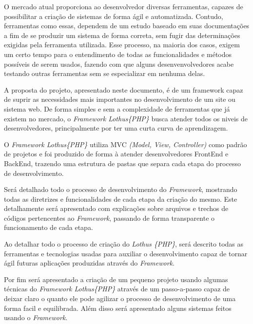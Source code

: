 \documentclass[brazil,ruledheader]{abntifes}
\begin{document}
\begin{resumo}
    O mercado atual proporciona ao desenvolvedor diversas ferramentas, capazes de possibilitar a criação de sistemas de forma ágil e automatizada. Contudo, ferramentas como essas, dependem de um estudo baseado em suas documentações a fim de se produzir um sistema de forma correta, sem fugir das determinações exigidas pela ferramenta utilizada. Esse processo, na maioria dos casos, exigem um certo tempo para o entendimento de todas as funcionalidades e métodos possíveis de serem usados, fazendo com que alguns desenvenvolvedores acabe testando outras ferramentas sem se especializar em nenhuma delas.

    A proposta do projeto, apresentado neste documento, é de um framework capaz de suprir as necessidades mais importantes no desenvolvimento de um site ou sistema web. De forma simples e sem a complexidade de ferramentas que já existem no mercado, o \emph{Framework Lothus\{PHP\}} busca atender todos os niveis de desenvolvedores, principalmente por ter uma curta curva de aprendizagem.

    O \emph{Framework Lothus\{PHP\}} utiliza MVC \emph{(Model, View, Controller)} como padrão de projetos e foi produzido de forma à atender desenvolvedores FrontEnd e BackEnd, trazendo uma estrutura de pastas que separa cada etapa do processo de desenvolvimento.

    Será detalhado todo o processo de desenvolvimento do \emph{Framework}, mostrando todas as diretrizes e funcionalidades de cada etapa da criação do mesmo. Este detalhamente será apresentado com explicações sobre arquivos e trechos de códigos pertencentes ao \emph{Framework}, passando de forma transparente o funcionamento de cada etapa.

    Ao detalhar todo o processo de criação do \emph{Lothus \{PHP\}}, será descrito todas as ferramentas e tecnologias usadas para auxiliar o desenvolvimento capaz de tornar ágil futuras aplicações produzidas através do \emph{Framework}.

    Por fim será apresentado a criação de um pequeno projeto usando algumas técnicas do \emph{Framework Lothus\{PHP\}} através de um passo-a-passo capaz de deixar claro o quanto ele pode agilizar o processo de desenvolvimento de uma forma facil e equilibrada. Além disso será apresentado alguns sistemas feitos usando o \emph{Framework}.
\end{resumo}


\end{document}
